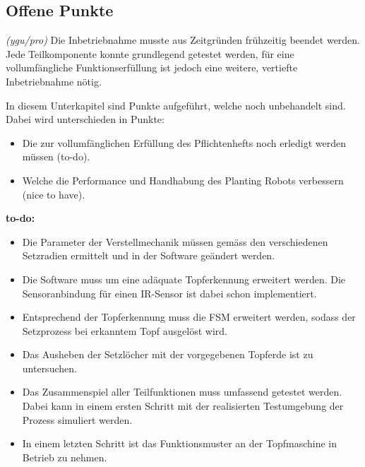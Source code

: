 \subsection{Offene Punkte}
\label{offenepunkte}
\textit{(ygu/pro)} Die Inbetriebnahme musste aus Zeitgründen frühzeitig beendet werden. Jede Teilkomponente konnte grundlegend getestet werden, für eine vollumfängliche Funktionserfüllung ist jedoch eine weitere, vertiefte Inbetriebnahme nötig.
\newline

In diesem Unterkapitel sind Punkte aufgeführt, welche noch unbehandelt sind. Dabei wird unterschieden in Punkte:
\begin{itemize}
	\item Die zur vollumfänglichen Erfüllung des Pflichtenhefts noch erledigt werden müssen (to-do). 
	
	\item Welche die Performance und Handhabung des Planting Robots verbessern (nice to have). 
\end{itemize}

\textbf{to-do:}
\begin{itemize}
	\item Die Parameter der Verstellmechanik müssen gemäss den verschiedenen Setzradien ermittelt und in der Software geändert werden.
	\item Die Software muss um eine adäquate Topferkennung erweitert werden. Die Sensoranbindung für einen IR-Sensor ist dabei schon implementiert.
	\item Entsprechend der Topferkennung muss die FSM erweitert werden, sodass der Setzprozess bei erkanntem Topf ausgelöst wird.
	
	\item Das Ausheben der Setzlöcher mit der vorgegebenen Topferde ist zu untersuchen.
	
	\item Das Zusammenspiel aller Teilfunktionen muss umfassend getestet werden. Dabei kann in einem ersten Schritt mit der realisierten Testumgebung der Prozess simuliert werden.
	
	\item In einem letzten Schritt ist das Funktionsmuster an der Topfmaschine in Betrieb zu nehmen.
\end{itemize}


